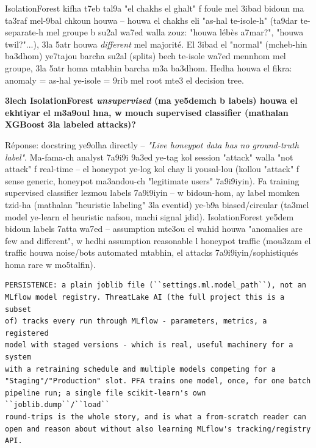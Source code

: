 \documentclass[11pt,a4paper]{report}
\begin{document}
\begin{analogy}
IsolationForest kifha t7eb tal9a "el chakhs el ghalt" f foule mel 3ibad
bidoun ma ta3raf mel-9bal chkoun houwa -- houwa el chakhs eli "as-hal
te-isole-h" (ta9dar te-separate-h mel groupe b su2al wa7ed walla zouz:
"houwa lébès a7mar?", "houwa twil?"...), 3la 5atr houwa \emph{different}
mel majorité. El 3ibad el "normal" (mcheb-hin ba3dhom) ye7tajou barcha
su2al (splits) bech te-isole wa7ed mennhom mel groupe, 3la 5atr homa
mtabhin barcha m3a ba3dhom. Hedha houwa el fikra: anomaly = as-hal
ye-isole = 9rib mel root mte3 el decision tree.
\end{analogy}

\begin{soual}
\textbf{3lech IsolationForest \emph{unsupervised} (ma ye5demch b labels)
houwa el ekhtiyar el m3a9oul hna, w mouch supervised classifier
(mathalan XGBoost 3la labeled attacks)?}

Réponse: docstring ye9olha directly -- \emph{"Live honeypot data has no
ground-truth label"}. Ma-fama-ch analyst 7a9i9i 9a3ed ye-tag kol session
"attack" walla "not attack" f real-time -- el honeypot ye-log kol chay
li yousal-lou (kollou "attack" f sense generic, honeypot ma3andou-ch
"legitimate users" 7a9i9iyin). Fa training supervised classifier lezmou
labels 7a9i9iyin -- w bidoun-hom, ay label momken tzid-ha (mathalan
"heuristic labeling" 3la eventid) ye-b9a biased/circular (ta3mel model
ye-learn el heuristic nafsou, machi signal jdid). IsolationForest ye5dem
bidoun labels 7atta wa7ed -- assumption mte3ou el wahid houwa "anomalies
are few and different", w hedhi assumption reasonable l honeypot traffic
(mou3zam el traffic houwa noise/bots automated mtabhin, el attacks
7a9i9iyin/sophistiqués homa rare w mo5talfin).
\end{soual}

\begin{lstlisting}[style=pystyle]
PERSISTENCE: a plain joblib file (``settings.ml.model_path``), not an
MLflow model registry. ThreatLake AI (the full project this is a subset
of) tracks every run through MLflow - parameters, metrics, a registered
model with staged versions - which is real, useful machinery for a system
with a retraining schedule and multiple models competing for a
"Staging"/"Production" slot. PFA trains one model, once, for one batch
pipeline run; a single file scikit-learn's own ``joblib.dump``/``load``
round-trips is the whole story, and is what a from-scratch reader can
open and reason about without also learning MLflow's tracking/registry
API.
\end{lstlisting}
\end{document}

